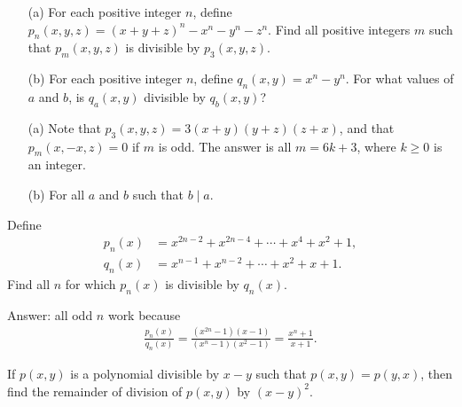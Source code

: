 \documentclass[12pt,a4paper]{memoir}
\theoremstyle{definition}
\begin{document}
\begin{tcolorbox}
	\begin{question}
		\begin{itemize}
			\item[(a)] For each positive integer $n$, define $p_n(x,y,z)=(x+y+z)^n - x^n - y^n - z^n$. Find all positive integers $m$ such that $p_m(x,y,z)$ is divisible by $p_3(x,y,z)$.
			\item[(b)] For each positive integer $n$, define $q_n(x,y)=x^n-y^n$. For what values of $a$ and $b$, is $q_a(x,y)$ divisible by $q_b(x,y)$?
		\end{itemize}
	\end{question}
\end{tcolorbox}

\begin{solution}[name=Solution by Parviz Shahriari]
	\begin{itemize}
		\item[(a)] Note that $p_3(x,y,z)=3(x+y)(y+z)(z+x)$, and that $p_m(x,-x,z)=0$ if $m$ is odd. The answer is all $m=6k+3$, where $k\geq 0$ is an integer.
		\item[(b)] For all $a$ and $b$ such that $b \mid a$.
	\end{itemize}
\end{solution}




\begin{tcolorbox}
	\begin{question}
		Define
		\begin{align*}
			p_n(x) &= x^{2n-2} + x^{2n-4} + \cdots + x^4+x^2+1,\\
			q_n(x) &= x^{n-1} + x^{n-2} + \cdots + x^2 + x + 1.
		\end{align*}
		Find all $n$ for which $p_n(x)$ is divisible by $q_n(x)$.
	\end{question}
\end{tcolorbox}

\begin{solution}[name=Solution by Parviz Shahriari]
	Answer: all odd $n$ work because
	\begin{align*}
		\frac{p_n(x)}{q_n(x)} = \frac{(x^{2n}-1)(x-1)}{(x^n-1)(x^2-1)} = \frac{x^n+1}{x+1}.
	\end{align*}
\end{solution}




\begin{tcolorbox}
	\begin{question}
		If $p(x,y)$ is a polynomial divisible by $x-y$ such that $p(x,y)=p(y,x)$, then find the remainder of division of $p(x,y)$ by $(x-y)^2$. 
	\end{question}
\end{tcolorbox}
\end{document}
